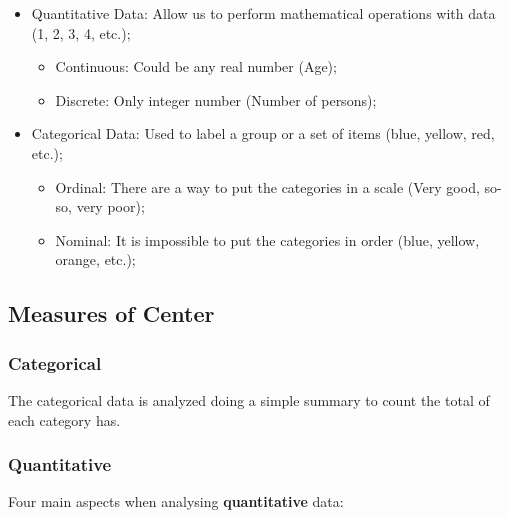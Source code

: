\documentclass[]{book}
\providecommand{\tightlist}{%
  \setlength{\itemsep}{0pt}\setlength{\parskip}{0pt}}
\begin{document}
\begin{itemize}
\tightlist
\item
  Quantitative Data: Allow us to perform mathematical operations with
  data (1, 2, 3, 4, etc.);

  \begin{itemize}
  \tightlist
  \item
    Continuous: Could be any real number (Age);
  \item
    Discrete: Only integer number (Number of persons);
  \end{itemize}
\item
  Categorical Data: Used to label a group or a set of items (blue,
  yellow, red, etc.);

  \begin{itemize}
  \tightlist
  \item
    Ordinal: There are a way to put the categories in a scale (Very
    good, so-so, very poor);
  \item
    Nominal: It is impossible to put the categories in order (blue,
    yellow, orange, etc.);
  \end{itemize}
\end{itemize}

\subsection{Measures of Center}\label{measures-of-center}

\subsubsection{Categorical}\label{categorical}

The categorical data is analyzed doing a simple summary to count the
total of each category has.

\subsubsection{Quantitative}\label{quantitative}

Four main aspects when analysing \textbf{quantitative} data:
\end{document}

